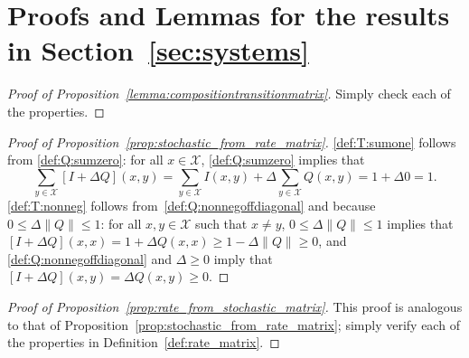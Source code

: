 \documentclass[10pt,a4paper]{paper}
\theoremstyle{definition}
\newcommand{\states}{\mathcal{X}}
\newcommand{\norm}[1]{\left\lVert #1 \right\rVert}
\begin{document}
\section{Proofs and Lemmas for the results in Section~\ref{sec:systems}}\label{app:systems}

\begin{proof}[Proof of Proposition~\ref{lemma:compositiontransitionmatrix}]
Simply check each of the properties.
\end{proof}


\begin{proof}[Proof of Proposition~\ref{prop:stochastic_from_rate_matrix}]
\ref{def:T:sumone} follows from \ref{def:Q:sumzero}: for all $x\in\states$, \ref{def:Q:sumzero} implies that
\begin{equation*}
\sum_{y\in\states} [I + \Delta Q](x,y) = \sum_{y\in\states}I(x,y) + \Delta \sum_{y\in\states}Q(x,y) = 1+\Delta 0=1.
\end{equation*}
\ref{def:T:nonneg} follows from~\ref{def:Q:nonnegoffdiagonal} and because $0\leq \Delta\norm{Q} \leq 1$: for all $x,y\in\states$ such that $x\neq y$, $0\leq\Delta\norm{Q} \leq 1$ implies that $[I+\Delta Q](x,x)=1+\Delta Q(x,x)\geq 1-\Delta\norm{Q}\geq0$, and \ref{def:Q:nonnegoffdiagonal} and $\Delta\geq0$ imply that $[I+\Delta Q](x,y)=\Delta Q(x,y)\geq0$.
\end{proof}

\begin{proof}[Proof of Proposition~\ref{prop:rate_from_stochastic_matrix}]
This proof is analogous to that of Proposition~\ref{prop:stochastic_from_rate_matrix}; simply verify each of the properties in Definition~\ref{def:rate_matrix}.
\end{proof}
\end{document}
